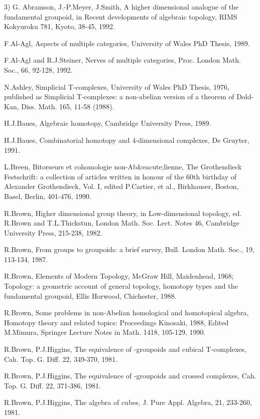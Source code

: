 3) G. Abramson, J.-P.Meyer, J.Smith, A higher  dimensional
analogue  of  the fundamental groupoid, in Recent developments
of  algebraic  topology,  RIMS Kokyuroku 781, Kyoto, 38-45,
1992. 

F.Al-Agl, Aspects of multiple categories, University of Wales
PhD  Thesis, 1989.

F.Al-Agl and R.J.Steiner, Nerves of  multiple  categories,
Proc.  London Math. Soc., 66, 92-128, 1992. 

N.Ashley, Simplicial T-complexes, University of Wales PhD
Thesis, 1976, published as Simplicial T-complexes: a non-abelian
version of a theorem of Dold-Kan, Diss. Math. 165, 11-58 (1988).

H.J.Baues, Algebraic homotopy, Cambridge University Press, 1989.

H.J.Baues, Combinatorial homotopy and 4-dimensional complexes,
De Gruyter,  1991. 

L.Breen, Bitorseurs et cohomologie non-Ab&eacute;lienne, The
Grothendieck Festschrift: a collection of articles written in
honour of the 60th birthday of Alexander Grothendieck, Vol. I,
edited P.Cartier, et  al., Birkhauser, Boston, Basel, Berlin,
401-476, 1990. 

R.Brown, Higher dimensional group theory, in Low-dimensional
topology, ed. R.Brown and T.L.Thickstun, London Math. Soc. Lect.
Notes 46, Cambridge University Press, 215-238, 1982. 

R.Brown, From groups to groupoids: a brief survey,  Bull.
London  Math.  Soc., 19, 113-134, 1987. 

R.Brown, Elements  of  Modern  Topology,  McGraw  Hill,
Maidenhead,  1968;    Topology: a geometric account of general
topology, homotopy types  and  the fundamental groupoid, Ellis
Horwood, Chichester, 1988. 

R.Brown, Some problems in non-Abelian homological and
homotopical  algebra, Homotopy theory and related topics:
Proceedings Kinosaki, 1988, Edited M.Mimura, Springer Lecture
Notes in Math. 1418,  105-129,  1990. 

R.Brown,  P.J.Higgins,  The  equivalence  of
\omega -groupoids   and   cubical T-complexes, Cah. Top.
G\eom. Diff. 22, 349-370, 1981. 

R.Brown,  P.J.Higgins,  The  equivalence  of 
\infty -groupoids   and   crossed complexes, Cah. Top. G\eom.
Diff. 22, 371-386, 1981. 

R.Brown, P.J.Higgins, The algebra of cubes, J. Pure  Appl.
Algebra,  21,  233-260, 1981. 

